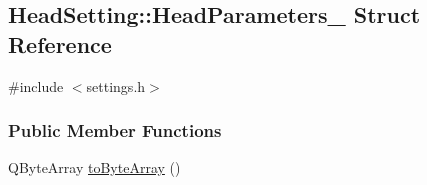 \hypertarget{structHeadSetting_1_1HeadParameters__}{}\subsection{Head\+Setting\+:\+:Head\+Parameters\+\_\+ Struct Reference}
\label{structHeadSetting_1_1HeadParameters__}


{\ttfamily \#include $<$settings.\+h$>$}

\subsubsection*{Public Member Functions}
\begin{DoxyCompactItemize}
\item 
Q\+Byte\+Array \mbox{\hyperlink{structHeadSetting_1_1HeadParameters___aaf3a8c897bc5b98a9f174e9b605afe27}{to\+Byte\+Array}} ()
\end{DoxyCompactItemize}
